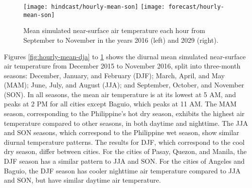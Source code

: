 	\begin{figure}	
		\centering
		\texttt{[image: hindcast/hourly-mean-son]}		
		\texttt{[image: forecast/hourly-mean-son]}		
		\caption{
			Mean simulated near-surface air temperature each hour from September to November in the years 2016 (left) and 2029 (right).
		}
		\label{fig:hourly-mean-son}
	\end{figure}

	Figures \ref{fig:hourly-mean-dja} to \ref{fig:hourly-mean-son} shows the diurnal mean simulated near-surface air temperature from December 2015 to November 2016, split into three-month seasons:
		December, January, and February (DJF);
		March, April, and May (MAM);
		June, July, and August (JJA);
		and
		September, October, and November (SON).
	In all seasons, the mean air temperature is at its lowest at 5 AM, and peaks at 2 PM for all cities except Baguio, which peaks at 11 AM.
	The MAM season, corresponding to the Philippine's hot dry season, exhibits the highest air temperature compared to other seasons, in both daytime and nighttime.
	The JJA and SON seasons, which correspond to the Philippine wet season, show similar diurnal temperature patterns.
	The results for DJF, which correspond to the cool dry season, differ between cities.
	For the cities of Pasay, Quezon, and Manila, the DJF season has a similar pattern to JJA and SON.
	For the cities of Angeles and Baguio, the DJF season has cooler nighttime air temperature compared to JJA and SON, but have similar daytime air temperature.
	
